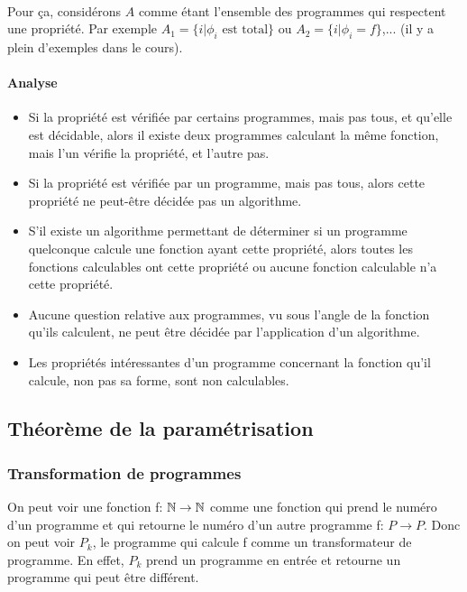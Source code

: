 \paragraph{}Pour ça, considérons $A$ comme étant l'ensemble des programmes qui 
respectent une propriété. Par exemple $A_1 = \{i| \phi_i \text{ est total}\}$ ou 
$A_2=\{i|\phi_i = f\}$,... (il y a plein d'exemples dans le cours).

\paragraph{Analyse} 
\begin{itemize}
	\item Si la propriété est vérifiée par certains programmes, mais pas tous, 
		et qu'elle est décidable, alors il existe deux programmes calculant la 
		même fonction, mais l'un vérifie la propriété, et l'autre pas.

	\item Si la propriété est vérifiée par un programme, mais pas tous, 
		alors cette propriété ne peut-être décidée pas un algorithme.

	\item S'il existe un algorithme permettant de déterminer si un 
		programme quelconque calcule une fonction ayant cette propriété, 
		alors toutes les fonctions calculables ont cette propriété ou 
		aucune fonction calculable n'a cette propriété.
		
	\item Aucune question relative aux programmes, vu sous l'angle de la 
		fonction qu'ils calculent, ne peut être décidée par 
		l'application d'un algorithme.
		
	\item Les propriétés intéressantes d'un programme concernant la 
		fonction qu'il calcule, non pas sa forme,
		sont non calculables.
\end{itemize}



\subsection{Théorème de la paramétrisation}
\label{sub:th_or_me_de_la_param_trisation}

\subsubsection{Transformation de programmes}
\label{ssub:transformation_de_programmes}
\begin{mydef}
	On peut voir une fonction f: $\mathbb{N} \rightarrow \mathbb{N}$ comme une fonction qui prend 
	le numéro d'un programme et qui retourne le numéro d'un autre programme f: $P 
	\rightarrow P$. Donc on peut voir $P_k$, le programme qui calcule f comme un 
	transformateur de programme. En effet, $P_k$ prend un programme en entrée et 
	retourne un programme qui peut être différent.
\end{mydef}

